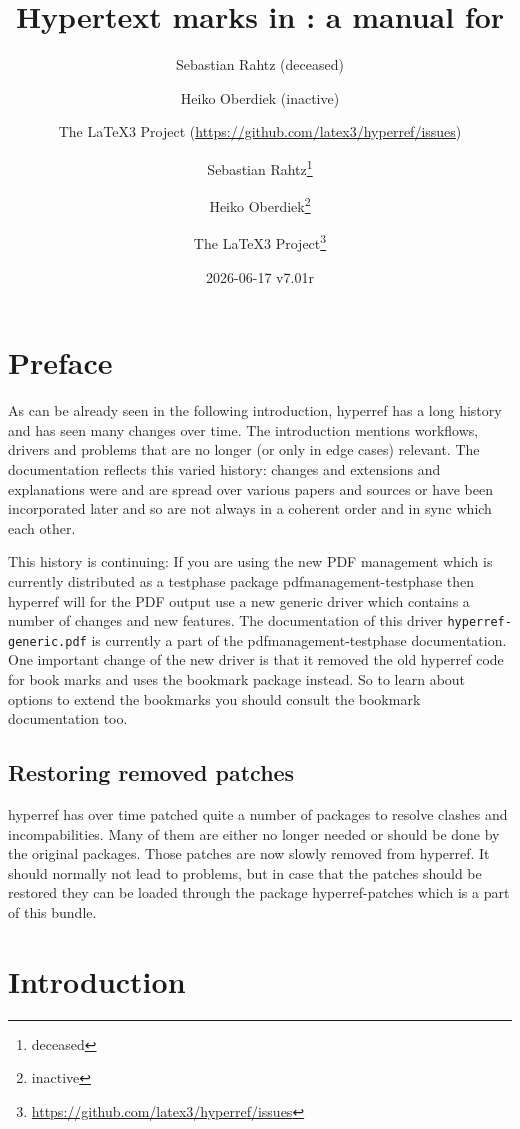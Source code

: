 \documentclass{article}
\author{Sebastian Rahtz (deceased)\and
       Heiko Oberdiek (inactive)\and
       The \LaTeX3 Project (\url{https://github.com/latex3/hyperref/issues})}
\author{Sebastian Rahtz\thanks{deceased}\and
       Heiko Oberdiek\thanks{inactive}\and
       The \LaTeX3 Project\thanks{\url{https://github.com/latex3/hyperref/issues}}}
\title{Hypertext marks in \hologo{LaTeX}: a manual for \xpackage{hyperref}}
\date{2026-06-17 v7.01r}
\newcommand*{\xpackage}[1]{\textsf{#1}}
\begin{document}
\thispagestyle{empty}
\maketitle
\tableofcontents
\setcounter{tocdepth}{2}%

\section{Preface}
As can be already seen in the following introduction, \xpackage{hyperref}
has a long history and has seen many changes over time. The introduction
mentions workflows, drivers and problems that are no longer (or only in edge cases) relevant.
The documentation reflects this varied history: changes
and extensions and explanations were and are spread over various papers and sources or
have been incorporated later and so are not always in a coherent order and in sync which each other.

This history is continuing: If you are using the new  PDF management
which is currently distributed as a testphase package \xpackage{pdfmanagement-testphase}
then \xpackage{hyperref} will for the PDF output use a new generic driver which
contains a number of changes and new features. The documentation of this driver
\texttt{hyperref-generic.pdf}
is currently a part of the \xpackage{pdfmanagement-testphase} documentation.
One important change of the new driver is
that it removed the old \xpackage{hyperref} code for book marks and uses
the \xpackage{bookmark} package instead. So to learn
about options to extend the bookmarks you should consult the \xpackage{bookmark} documentation
too.

\subsection{Restoring removed patches}

\xpackage{hyperref} has over time patched quite a number of packages to resolve clashes and incompabilities.
Many of them are either no longer needed or should be done by the original packages.
Those patches are now slowly removed from \xpackage{hyperref}.  It should normally not lead to problems, but
in case that the patches should be restored they can be loaded through the package \xpackage{hyperref-patches} which
is a part of this bundle.



\section{Introduction}
\end{document}
